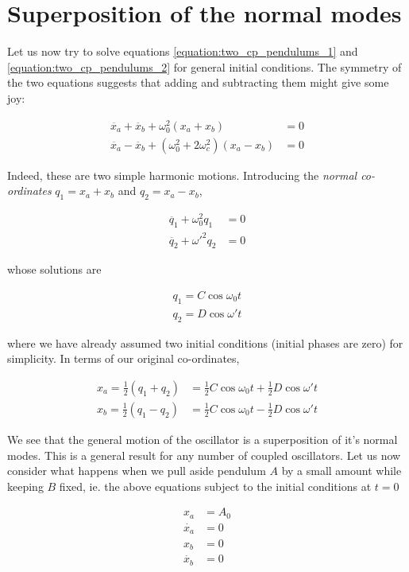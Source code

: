 \documentclass[a4paper,10pt]{article}
\begin{document}
\section{Superposition of the normal modes}

Let us now try to solve equations \ref{equation:two_cp_pendulums_1} and \ref{equation:two_cp_pendulums_2} for general initial conditions. The 
symmetry of the two equations suggests that adding and subtracting them might give some joy:

\begin{align*}
\ddot{x_a} + \ddot{x_b} + \omega_0^2(x_a + x_b) &= 0\\
\ddot{x_a} - \ddot{x_b} + (\omega_0^2 + 2\omega_c^2)(x_a - x_b) &= 0
\end{align*}

Indeed, these are two simple harmonic motions. Introducing the \textit{normal co-ordinates} $q_1 = x_a + x_b$ and $q_2 = x_a - x_b$,

\begin{align*}
\ddot{q_1} + \omega_0^2q_1 &= 0\\
\ddot{q_2} + \omega\prime^{2}q_2 &= 0
\end{align*}

whose solutions are

\begin{align*}
q_1 = C\cos{\omega_0t}\\
q_2 = D\cos{\omega\prime t}
\end{align*}

where we have already assumed two initial conditions (initial phases are zero) for simplicity. In terms of our original co-ordinates,

\begin{align*}
x_a = \frac{1}{2}(q_1 + q_2) &= \frac{1}{2}C\cos{\omega_0t} + \frac{1}{2}D\cos{\omega\prime t}\\
x_b = \frac{1}{2}(q_1 - q_2) &= \frac{1}{2}C\cos{\omega_0t} - \frac{1}{2}D\cos{\omega\prime t}
\end{align*}

We see that the general motion of the oscillator is a superposition of it's normal modes. This is a general result for any number of coupled oscillators. Let us now consider what happens when we pull aside pendulum $A$ by a small amount while keeping $B$ fixed, ie. the above equations
subject to the initial conditions at $t=0$

\begin{align*}
x_a &= A_0\\
\dot{x_a} &= 0\\
x_b &= 0\\
\dot{x_b} &= 0\\
\end{align*}
\end{document}
